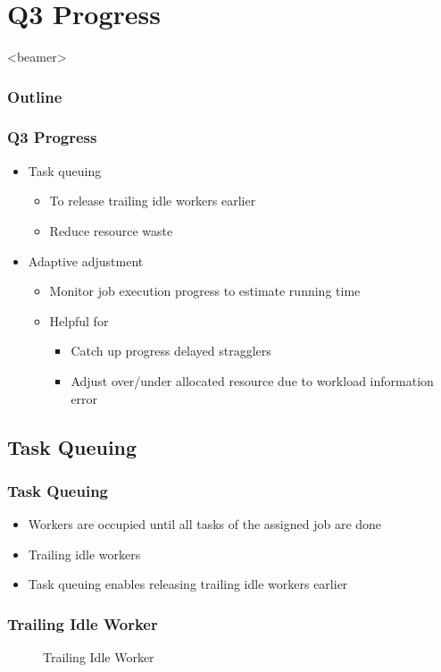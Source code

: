 \documentclass{beamer}
\begin{document}
\section{Q3 Progress}
\begin{frame}<beamer>
  \frametitle{Outline}
  \tableofcontents[
    currentsubsection,
    sectionstyle=show/shaded,
    subsectionstyle=show/show/shaded,
  ]
\end{frame}
\begin{frame}
  \frametitle{Q3 Progress}
  \begin{itemize}
    \item Task queuing
      \begin{itemize}
        \item To release trailing idle workers earlier
        \item Reduce resource waste
      \end{itemize}
    \item Adaptive adjustment
      \begin{itemize}
        \item Monitor job execution progress to estimate running time
        \item Helpful for
          \begin{itemize}
            \item Catch up progress delayed stragglers
            \item Adjust over/under allocated resource due to workload
              information error
          \end{itemize}
      \end{itemize}
  \end{itemize}
\end{frame}
\subsection{Task Queuing}
\begin{frame}
  \frametitle{Task Queuing}
  \begin{itemize}
    \item Workers are occupied until all tasks of the assigned job are
      done
    \item Trailing idle workers
    \item Task queuing enables releasing trailing idle workers earlier
  \end{itemize}
\end{frame}

\begin{frame}
  \frametitle{Trailing Idle Worker}

  \begin{figure}[h]
    \centering
    \resizebox{\textheight}{!}{
      
    }
    \caption{Trailing Idle Worker}
  \end{figure}
\end{frame}
\end{document}
